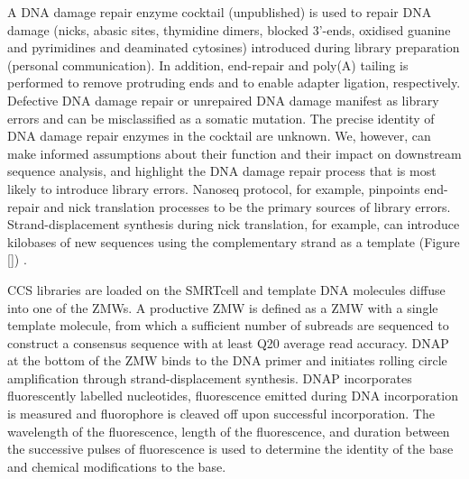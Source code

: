 A DNA damage repair enzyme cocktail (unpublished) is used to repair DNA damage (nicks, abasic sites, thymidine dimers, blocked 3’-ends, oxidised guanine and pyrimidines and deaminated cytosines) introduced during library preparation (personal communication). In addition, end-repair and poly(A) tailing is performed to remove protruding ends and to enable adapter ligation, respectively. Defective DNA damage repair or unrepaired DNA damage manifest as library errors and can be misclassified as a somatic mutation. The precise identity of DNA damage repair enzymes in the cocktail are unknown. We, however, can make informed assumptions about their function and their impact on downstream sequence analysis, and highlight the DNA damage repair process that is most likely to introduce library errors. Nanoseq protocol, for example, pinpoints end-repair and nick translation processes to be the primary sources of library errors. Strand-displacement synthesis during nick translation, for example, can introduce kilobases of new sequences using the complementary strand as a template (Figure \ref{}) \cite{}. 

CCS libraries are loaded on the SMRTcell and template DNA molecules diffuse into one of the ZMWs. A productive ZMW is defined as a ZMW with a single template molecule, from which a sufficient number of subreads are sequenced to construct a consensus sequence with at least Q20 average read accuracy. DNAP at the bottom of the ZMW binds to the DNA primer and initiates rolling circle amplification through strand-displacement synthesis. DNAP incorporates fluorescently labelled nucleotides, fluorescence emitted during DNA incorporation is measured and fluorophore is cleaved off upon successful incorporation. The wavelength of the fluorescence, length of the fluorescence, and duration between the successive pulses of fluorescence is used to determine the identity of the base and chemical modifications to the base. 

